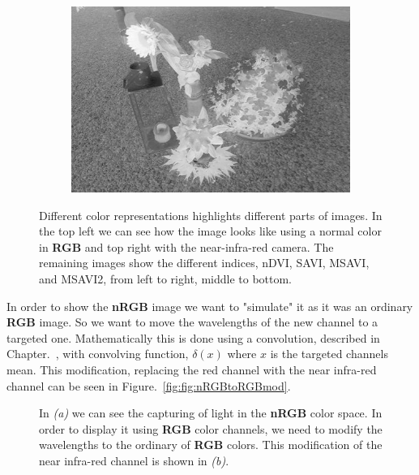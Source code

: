 \begin{figure}[H]
\begin{subfigure}[b]{0.49\textwidth}
		\caption{}
		\label{fig:rgbVSnrgbMSAVI}
    \end{subfigure}
    \begin{subfigure}[b]{0.49\textwidth}
        \centering
        \includegraphics[width=\textwidth]{./figure/appendix/color_rep/images/msavi2.jpg}
		\caption{}
		\label{fig:rgbVSnrgbMSAVI2}
    \end{subfigure}
    \caption{Different color representations highlights different parts of images. In the top left we can see how the image looks like using a normal color in \textbf{RGB} and top right with the near-infra-red camera. The remaining images show the different indices, nDVI, SAVI, MSAVI, and MSAVI2, from left to right, middle to bottom.}
    \label{fig:rgbVSnrgb}
\end{figure}

In order to show the \textbf{nRGB} image we want to "simulate" it as it was an ordinary \textbf{RGB} image. So we want to move the wavelengths of the new channel to a targeted one. Mathematically this is done using a convolution, described in Chapter.~\label{chap:conv}, with convolving function, $\delta(x)$ where $x$ is the targeted channels mean. This modification, replacing the red channel with the near infra-red channel can be seen in Figure.~\ref{fig:fig:nRGBtoRGBmod}.

\begin{figure}[H]
    \centering
    \captionsetup[subfigure]{justification=centering}
    \begin{subfigure}[b]{0.49\textwidth}
        \centering
        \resizebox{\textwidth}{!}{
            
        }
		\caption{}
    \end{subfigure}
    \begin{subfigure}[b]{0.49\textwidth}
        \centering
        \resizebox{\textwidth}{!}{
            
        }
		\caption{}
    \end{subfigure}
    \caption{In \textit{(a)} we can see the capturing of light in the \textbf{nRGB} color space. In order to display it using \textbf{RGB} color channels, we need to modify the wavelengths to the ordinary of \textbf{RGB} colors. This modification of the near infra-red channel is shown in \textit{(b)}.}
    \label{fig:nRGBtoRGBmod}
\end{figure}

